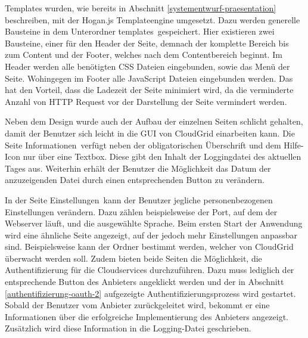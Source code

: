 Templates wurden, wie bereits in Abschnitt \ref{systementwurf-praesentation} beschreiben, mit der Hogan.js Templateengine umgesetzt.
Dazu werden generelle Bausteine in dem Unterordner \frqq templates\flqq\ gespeichert.
Hier existieren zwei Bausteine, einer für den Header der Seite, demnach der komplette Bereich bis zum Content und der Footer, welches nach dem Contentbereich beginnt.
Im Header werden alle benötigten \ac{CSS} Dateien eingebunden, sowie das Menü der Seite.
Wohingegen im Footer alle JavaScript Dateien eingebunden werden.
Das hat den Vorteil, dass die Ladezeit der Seite minimiert wird, da die verminderte Anzahl von \ac{HTTP} Request vor der Darstellung der Seite vermindert werden.

Neben dem Design wurde auch der Aufbau der einzelnen Seiten schlicht gehalten, damit der Benutzer sich leicht in die \ac{GUI} von CloudGrid einarbeiten kann.
Die Seite \frqq Informationen\flqq\ verfügt neben der obligatorischen Überschrift und dem Hilfe-Icon nur über eine Textbox.
Diese gibt den Inhalt der Loggingdatei des aktuellen Tages aus.
Weiterhin erhält der Benutzer die Möglichkeit das Datum der anzuzeigenden Datei durch einen entsprechenden Button zu verändern.

In der Seite \frqq Einstellungen\flqq\ kann der Benutzer jegliche personenbezogenen Einstellungen verändern.
Dazu zählen beispielsweise der Port, auf dem der Webserver läuft, und die ausgewählte Sprache.
Beim ersten Start der Anwendung wird eine ähnliche Seite angezeigt, auf der jedoch mehr Einstellungen anpassbar sind.
Beispielsweise kann der Ordner bestimmt werden, welcher von CloudGrid überwacht werden soll.
Zudem bieten beide Seiten die Möglichkeit, die Authentifizierung für die Cloudservices durchzuführen.
Dazu muss lediglich der entsprechende Button des Anbieters angeklickt werden und der in Abschnitt \ref{authentifizierung-oauth-2} aufgezeigte Authentifizierungsprozess wird gestartet.
Sobald der Benutzer vom Anbieter zurückgeleitet wird, bekommt er eine Informationen über die erfolgreiche Implementierung des Anbieters angezeigt.
Zusätzlich wird diese Information in die Logging-Datei geschrieben.
